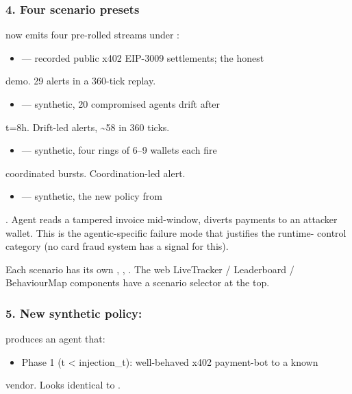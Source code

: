 \documentclass[11pt]{article}
\begin{document}
\subsubsection*{4. Four scenario presets}
 now emits four pre-rolled streams under :

\begin{itemize}
  \item \textbf{} --- recorded public x402 EIP-3009 settlements; the honest
\end{itemize}
demo. 29 alerts in a 360-tick replay.

\begin{itemize}
  \item \textbf{} --- synthetic, 20 compromised agents drift after
\end{itemize}
t=8h. Drift-led alerts, \textasciitilde{}58 in 360 ticks.

\begin{itemize}
  \item \textbf{} --- synthetic, four rings of 6--9 wallets each fire
\end{itemize}
coordinated bursts. Coordination-led alert.

\begin{itemize}
  \item \textbf{} --- synthetic, the new policy from
\end{itemize}
. Agent reads a tampered invoice mid-window, diverts payments to an attacker wallet. This is the agentic-specific failure mode that justifies the runtime- control category (no card fraud system has a signal for this).

Each scenario has its own , , . The web LiveTracker / Leaderboard / BehaviourMap components have a scenario selector at the top.

\subsubsection*{5. New synthetic policy: }
 produces an agent that:

\begin{itemize}
  \item Phase 1 (t < injection\_t): well-behaved x402 payment-bot to a known
\end{itemize}
vendor. Looks identical to .
\end{document}
